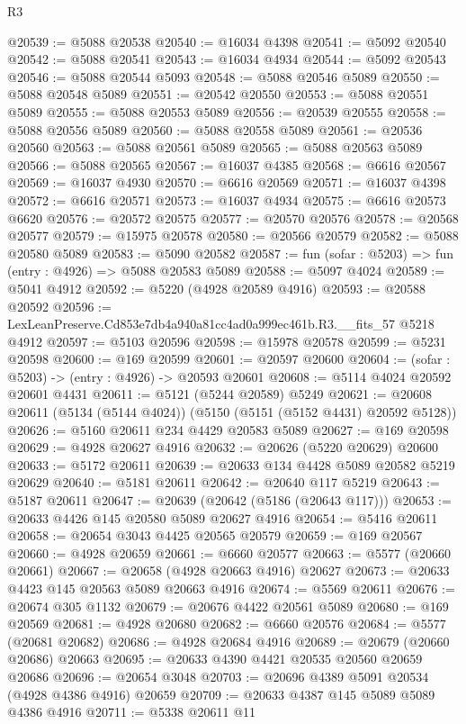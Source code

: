 \begin{lexlean}{R3}
\begin{coremodule}
@20539 := @5088 @20538
@20540 := @16034 @4398
@20541 := @5092 @20540
@20542 := @5088 @20541
@20543 := @16034 @4934
@20544 := @5092 @20543
@20546 := @5088 @20544 @5093
@20548 := @5088 @20546 @5089
@20550 := @5088 @20548 @5089
@20551 := @20542 @20550
@20553 := @5088 @20551 @5089
@20555 := @5088 @20553 @5089
@20556 := @20539 @20555
@20558 := @5088 @20556 @5089
@20560 := @5088 @20558 @5089
@20561 := @20536 @20560
@20563 := @5088 @20561 @5089
@20565 := @5088 @20563 @5089
@20566 := @5088 @20565
@20567 := @16037 @4385
@20568 := @6616 @20567
@20569 := @16037 @4930
@20570 := @6616 @20569
@20571 := @16037 @4398
@20572 := @6616 @20571
@20573 := @16037 @4934
@20575 := @6616 @20573 @6620
@20576 := @20572 @20575
@20577 := @20570 @20576
@20578 := @20568 @20577
@20579 := @15975 @20578
@20580 := @20566 @20579
@20582 := @5088 @20580 @5089
@20583 := @5090 @20582
@20587 := fun (sofar : @5203) => fun (entry : @4926) => @5088 @20583 @5089
@20588 := @5097 @4024
@20589 := @5041 @4912
@20592 := @5220 (@4928 @20589 @4916)
@20593 := @20588 @20592
@20596 := LexLeanPreserve.Cd853e7db4a940a81cc4ad0a999ec461b.R3.__fits_57 @5218 @4912
@20597 := @5103 @20596
@20598 := @15978 @20578
@20599 := @5231 @20598
@20600 := @169 @20599
@20601 := @20597 @20600
@20604 := (sofar : @5203) -> (entry : @4926) -> @20593 @20601
@20608 := @5114 @4024 @20592 @20601 @4431
@20611 := @5121 (@5244 @20589) @5249
@20621 := @20608 @20611 (@5134 (@5144 @4024)) (@5150 (@5151 (@5152 @4431) @20592 @5128))
@20626 := @5160 @20611 @234 @4429 @20583 @5089
@20627 := @169 @20598
@20629 := @4928 @20627 @4916
@20632 := @20626 (@5220 @20629) @20600
@20633 := @5172 @20611
@20639 := @20633 @134 @4428 @5089 @20582 @5219 @20629
@20640 := @5181 @20611
@20642 := @20640 @117 @5219
@20643 := @5187 @20611
@20647 := @20639 (@20642 (@5186 (@20643 @117)))
@20653 := @20633 @4426 @145 @20580 @5089 @20627 @4916
@20654 := @5416 @20611
@20658 := @20654 @3043 @4425 @20565 @20579
@20659 := @169 @20567
@20660 := @4928 @20659
@20661 := @6660 @20577
@20663 := @5577 (@20660 @20661)
@20667 := @20658 (@4928 @20663 @4916) @20627
@20673 := @20633 @4423 @145 @20563 @5089 @20663 @4916
@20674 := @5569 @20611
@20676 := @20674 @305 @1132
@20679 := @20676 @4422 @20561 @5089
@20680 := @169 @20569
@20681 := @4928 @20680
@20682 := @6660 @20576
@20684 := @5577 (@20681 @20682)
@20686 := @4928 @20684 @4916
@20689 := @20679 (@20660 @20686) @20663
@20695 := @20633 @4390 @4421 @20535 @20560 @20659 @20686
@20696 := @20654 @3048
@20703 := @20696 @4389 @5091 @20534 (@4928 @4386 @4916) @20659
@20709 := @20633 @4387 @145 @5089 @5089 @4386 @4916
@20711 := @5338 @20611 @11

\end{coremodule}
\end{lexlean}
